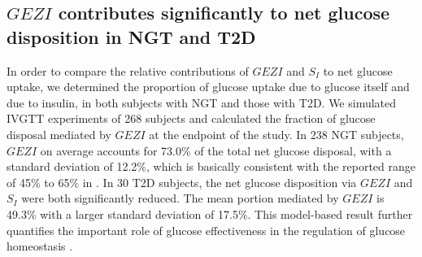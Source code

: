 \documentclass[utf8]{frontiersSCNS} %
\begin{document}
\subsection{$GEZI$ contributes significantly to net glucose disposition in NGT and T2D}
In order to compare the relative contributions of $GEZI$ and $S_I$ to net glucose uptake, we determined the proportion of glucose uptake due to glucose itself and due to insulin, in both subjects with NGT and those with T2D. We simulated IVGTT experiments of 268 subjects and calculated the fraction of glucose disposal mediated by $GEZI$ at the endpoint of the study. In 238 NGT subjects, $GEZI$ on average accounts for 73.0\% of the total net glucose disposal, with a standard deviation of 12.2\%, which is basically consistent with the reported range of 45\% to 65\% in \citet{Alford_2018}. In 30 T2D subjects, the net glucose disposition via $GEZI$ and $S_I$ were both significantly reduced. The mean portion mediated by $GEZI$ is 49.3\% with a larger standard deviation of 17.5\%. This model-based result further quantifies the important role of glucose effectiveness in the regulation of glucose homeostasis \citep{Dube2015}.
\end{document}
